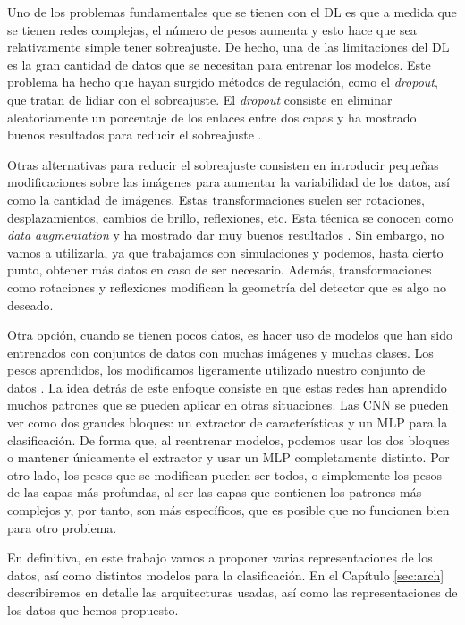 \documentclass[a4paper,12pt,oneside,titlepage]{book}
\begin{document}
Uno de los problemas fundamentales que se tienen con el DL es que a medida que se tienen redes complejas, el número de pesos aumenta y esto hace que sea relativamente simple tener sobreajuste. De hecho, una de las limitaciones del DL es la gran cantidad de datos que se necesitan para entrenar los modelos. Este problema ha hecho que hayan surgido métodos de regulación, como el \textit{dropout}, que tratan de lidiar con el sobreajuste. El \textit{dropout} consiste en eliminar aleatoriamente un porcentaje de los enlaces entre dos capas y ha mostrado buenos resultados para reducir el sobreajuste \cite{dropout}.

Otras alternativas para reducir el sobreajuste consisten en introducir pequeñas modificaciones sobre las imágenes para aumentar la variabilidad de los datos, así como la cantidad de imágenes. Estas transformaciones suelen ser rotaciones, desplazamientos, cambios de brillo, reflexiones, etc. Esta técnica se conocen como \textit{data augmentation} y ha mostrado dar muy buenos resultados \cite{dataaug}. Sin embargo, no vamos a utilizarla, ya que trabajamos con simulaciones y podemos, hasta cierto punto, obtener más datos en caso de ser necesario. Además, transformaciones como rotaciones y reflexiones modifican la geometría del detector que es algo no deseado.

Otra opción, cuando se tienen pocos datos, es hacer uso de modelos que han sido entrenados con conjuntos de datos con muchas imágenes y muchas clases. Los pesos aprendidos, los modificamos ligeramente utilizado nuestro conjunto de datos \cite{transfer}. La idea detrás de este enfoque consiste en que estas redes han aprendido muchos patrones que se pueden aplicar en otras situaciones. Las CNN se pueden ver como dos grandes bloques: un extractor de características y un MLP para la clasificación. De forma que, al reentrenar modelos, podemos usar los dos bloques o mantener únicamente el extractor y usar un MLP completamente distinto. Por otro lado, los pesos que se modifican pueden ser todos, o simplemente los pesos de las capas más profundas, al ser las capas que contienen los patrones más complejos y, por tanto, son más específicos, que es posible que no funcionen bien para otro problema.

En definitiva, en este trabajo vamos a proponer varias representaciones de los datos, así como distintos modelos para la clasificación. En el Capítulo \ref{sec:arch} describiremos en detalle las arquitecturas usadas, así como las representaciones de los datos que hemos propuesto.
\end{document}
